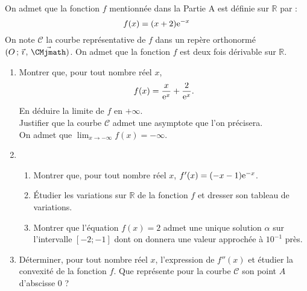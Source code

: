 \documentclass[11pt,fleqn, openany]{book} %
\begin{document}
\begin{exercise}[subtitle={(Métropole 2021)}]
On admet que la fonction $f$ mentionnée dans la Partie A est définie sur $\mathbb{R}$ par :
\[f(x)=(x+2)\mathrm{e}^{-x}\]
On note $\mathcal{C}$ la courbe représentative de $f$ dans un repère orthonormé $\Oij$.
On admet que la fonction $f$ est deux fois dérivable sur $\mathbb{R}$.
\begin{enumerate}
\item  Montrer que, pour tout nombre réel $x$,
\[f(x)=\dfrac{x}{\mathrm{e}^x}+\dfrac{2}{\mathrm{e}^x}.\]
En déduire la limite de $f$ en $+\infty$.\\
Justifier que la courbe $\mathcal{C}$ admet une asymptote que l'on précisera.\\
On admet que $\displaystyle\lim_{x \to - \infty}f(x)=-\infty$.
\item \begin{enumerate}
\item Montrer que, pour tout nombre réel $x$, $f'(x)=(-x-1)\mathrm{e}^{-x}$.
\item Étudier les variations sur $\mathbb{R}$ de la fonction $f$ et dresser son tableau de variations.
\item Montrer que l'équation $f(x) = 2$ admet une unique solution $\alpha$ sur l'intervalle $[-2; -1]$ dont on donnera une valeur approchée à $10^{-1}$ près.\end{enumerate}
\item Déterminer, pour tout nombre réel $x$, l'expression de $f''(x)$ et étudier la convexité de la fonction $f$. Que représente pour la courbe $\mathcal{C}$ son point $A$ d'abscisse 0 ?\end{enumerate}
\newpage
\end{exercise}
\end{document}
